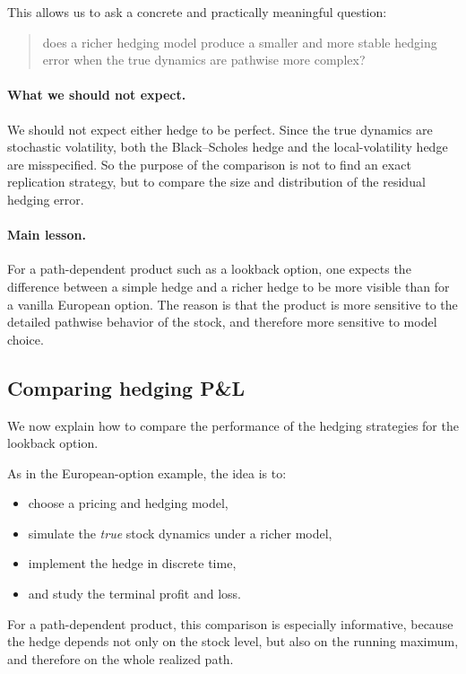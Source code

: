 \documentclass[11pt]{article}
\theoremstyle{plain}
\theoremstyle{definition}
\theoremstyle{remark}
\begin{document}
This allows us to ask a concrete and practically meaningful question:
\begin{quote}
does a richer hedging model produce a smaller and more stable hedging
error when the true dynamics are pathwise more complex?
\end{quote}

\paragraph{What we should not expect.}
We should not expect either hedge to be perfect.
Since the true dynamics are stochastic volatility, both the
Black--Scholes hedge and the local-volatility hedge are misspecified.
So the purpose of the comparison is not to find an exact replication
strategy, but to compare the size and distribution of the residual
hedging error.

\paragraph{Main lesson.}
For a path-dependent product such as a lookback option, one expects the
difference between a simple hedge and a richer hedge to be more visible
than for a vanilla European option.
The reason is that the product is more sensitive to the detailed
pathwise behavior of the stock, and therefore more sensitive to model
choice.

\subsection{Comparing hedging P\&L}

We now explain how to compare the performance of the hedging strategies
for the lookback option.

As in the European-option example, the idea is to:
\begin{itemize}[leftmargin=1.4em]
    \item choose a pricing and hedging model,
    \item simulate the \emph{true} stock dynamics under a richer model,
    \item implement the hedge in discrete time,
    \item and study the terminal profit and loss.
\end{itemize}

For a path-dependent product, this comparison is especially informative,
because the hedge depends not only on the stock level, but also on the
running maximum, and therefore on the whole realized path.
\end{document}
